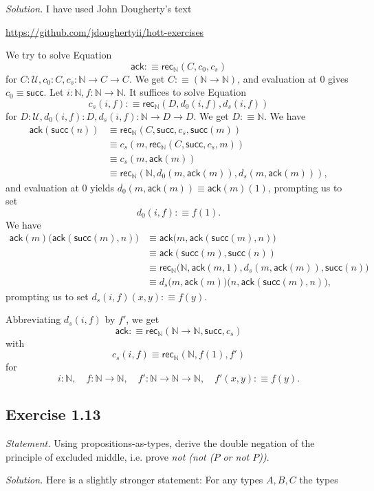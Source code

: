 \documentclass[12pt]{article}
\newcommand{\ack}{\mathsf{ack}}
\newcommand{\N}{\mathbb N}
\newcommand{\nn}{\noindent}
\newcommand{\rec}{\mathsf{rec}}
\newcommand{\su}{\mathsf{succ}}
\newcommand{\U}{\mathcal U}
\begin{document}
\nn\emph{Solution.} I have used John Dougherty's text 

\nn\href{https://github.com/jdoughertyii/hott-exercises}{https://github.com/jdoughertyii/hott-exercises}

We try to solve Equation 
\begin{equation}\label{ack1}
\ack:\equiv\rec_\N(C,c_0,c_s)
\end{equation}
for $C:\U,c_0:C,c_s:\N\to C\to C$. We get $C:\equiv(\N\to\N)$, and evaluation at 0 gives $c_0\equiv\su$. Let $i:\N,f:\N\to\N$. It suffices to solve Equation 
\begin{equation}\label{ack2}
c_s(i,f):\equiv\rec_\N(D,d_0(i,f),d_s(i,f))
\end{equation}
for $D:\U,d_0(i,f):D,d_s(i,f):\N\to D\to D$. We get $D:\equiv\N$. We have
\begin{align*}
\ack(\su(n))&\equiv\rec_\N(C,\su,c_s,\su(m))\\
&\equiv c_s(m,\rec_\N(C,\su,c_s,m))\\
&\equiv c_s(m,\ack(m))\\
&\equiv\rec_\N(\N,d_0(m,\ack(m)),d_s(m,\ack(m))),
\end{align*}
and evaluation at 0 yields $d_0(m,\ack(m))\equiv\ack(m)(1)$, prompting us to set $$d_0(i,f):\equiv f(1).$$ We have 
\begin{align*}
\ack(m)\big(\ack(\su(m),n)\big)&\equiv\ack\big(m,\ack(\su(m),n)\big)\\ 
&\equiv\ack(\su(m),\su(n))\\ 
&\equiv\rec_\N\big(\N,\ack(m,1),d_s(m,\ack(m)),\su(n)\big)\\
&\equiv d_s\big(m,\ack(m)\big)\big(n,\ack(\su(m),n)\big),
\end{align*}
prompting us to set $d_s(i,f)(x,y):\equiv f(y)$. 

Abbreviating $d_s(i,f)$ by $f'$, we get 
$$
\ack:\equiv\rec_\N(\N\to\N,\su,c_s)
$$ 
with 
$$ 
c_s(i,f)\equiv\rec_\N(\N,f(1),f')
$$ 
for 
$$ 
i:\N,\quad f:\N\to\N,\quad f':\N\to\N\to\N,\quad f'(x,y):\equiv f(y).
$$


\subsection{Exercise 1.13}

\emph{Statement.} Using propositions-as-types, derive the double negation of the principle of excluded middle, i.e. prove \emph{not (not ($P$ or not $P$))}.

\nn\emph{Solution.} Here is a slightly stronger statement: For any types $A,B,C$ the types
\end{document}
